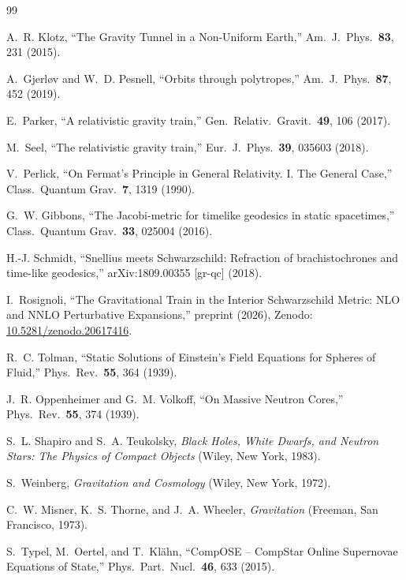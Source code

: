 \documentclass[
  aps,
  prd,
  twocolumn,
  nofootinbib,
  superscriptaddress,
  longbibliography
]{revtex4-2}
\begin{document}


\begin{thebibliography}{99}

A.~R. Klotz,
``The Gravity Tunnel in a Non-Uniform Earth,''
Am.\ J.\ Phys.\ \textbf{83}, 231 (2015).

A.~Gjerl\o{}v and W.~D. Pesnell,
``Orbits through polytropes,''
Am.\ J.\ Phys.\ \textbf{87}, 452 (2019).

E.~Parker,
``A relativistic gravity train,''
Gen.\ Relativ.\ Gravit.\ \textbf{49}, 106 (2017).

M.~Seel,
``The relativistic gravity train,''
Eur.\ J.\ Phys.\ \textbf{39}, 035603 (2018).

V.~Perlick,
``On Fermat's Principle in General Relativity. I. The General Case,''
Class.\ Quantum Grav.\ \textbf{7}, 1319 (1990).

G.~W. Gibbons,
``The Jacobi-metric for timelike geodesics in static spacetimes,''
Class.\ Quantum Grav.\ \textbf{33}, 025004 (2016).

H.-J. Schmidt,
``Snellius meets Schwarzschild: Refraction of brachistochrones and
time-like geodesics,''
arXiv:1809.00355 [gr-qc] (2018).

I.~Rosignoli,
``The Gravitational Train in the Interior Schwarzschild Metric:
NLO and NNLO Perturbative Expansions,''
preprint (2026), Zenodo:
\href{https://doi.org/10.5281/zenodo.20617416}{10.5281/zenodo.20617416}.

R.~C. Tolman,
``Static Solutions of Einstein's Field Equations for Spheres of Fluid,''
Phys.\ Rev.\ \textbf{55}, 364 (1939).

J.~R. Oppenheimer and G.~M. Volkoff,
``On Massive Neutron Cores,''
Phys.\ Rev.\ \textbf{55}, 374 (1939).

S.~L. Shapiro and S.~A. Teukolsky,
\textit{Black Holes, White Dwarfs, and Neutron Stars:
The Physics of Compact Objects}
(Wiley, New York, 1983).

S.~Weinberg,
\textit{Gravitation and Cosmology}
(Wiley, New York, 1972).

C.~W. Misner, K.~S. Thorne, and J.~A. Wheeler,
\textit{Gravitation}
(Freeman, San Francisco, 1973).

S.~Typel, M.~Oertel, and T.~Kl\"{a}hn,
``{CompOSE} -- {CompStar} Online Supernovae Equations of State,''
Phys.\ Part.\ Nucl.\ \textbf{46}, 633 (2015).


\end{thebibliography}
\end{document}
